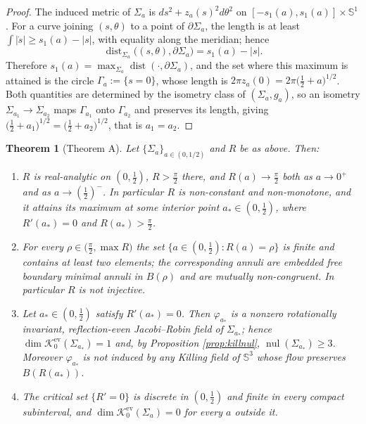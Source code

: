 \documentclass[11pt,a4paper]{amsart}
\theoremstyle{plain}
\newtheorem{theorem}{Theorem}[section]
\theoremstyle{definition}
\newcommand{\Sph}{\mathbb{S}}
\newcommand{\nul}{\operatorname{nul}}
\newcommand{\dist}{\operatorname{dist}}
\newcommand{\Ker}{\mathcal{K}}
\begin{document}
\begin{proof}
The induced metric of $\Sigma_a$ is $ds^2+z_a(s)^2d\theta^2$ on $[-s_1(a),s_1(a)]\times\Sph^1$. For a curve joining $(s,\theta)$ to a point of $\partial\Sigma_a$, the length is at least $\int|\dot s|\geq s_1(a)-|s|$, with equality along the meridian; hence
\[
\dist_{\Sigma_a}\bigl((s,\theta),\partial\Sigma_a\bigr)=s_1(a)-|s| .
\]
Therefore $s_1(a)=\max_{\Sigma_a}\dist(\cdot,\partial\Sigma_a)$, and the set where this maximum is attained is the circle $\Gamma_a:=\{s=0\}$, whose length is $2\pi z_a(0)=2\pi\bigl(\tfrac12+a\bigr)^{1/2}$. Both quantities are determined by the isometry class of $(\Sigma_a,g_a)$, so an isometry $\Sigma_{a_1}\to\Sigma_{a_2}$ maps $\Gamma_{a_1}$ onto $\Gamma_{a_2}$ and preserves its length, giving $\bigl(\tfrac12+a_1\bigr)^{1/2}=\bigl(\tfrac12+a_2\bigr)^{1/2}$, that is $a_1=a_2$.
\end{proof}

\begin{theorem}[Theorem A]\label{thm:main}
Let $\{\Sigma_a\}_{a\in(0,1/2)}$ and $R$ be as above. Then:
\begin{enumerate}
\item[\textup{(i)}] $R$ is real-analytic on $(0,\tfrac12)$, $R>\tfrac\pi2$ there, and $R(a)\to\tfrac\pi2$ both as $a\to 0^+$ and as $a\to(\tfrac12)^-$. In particular $R$ is non-constant and non-monotone, and it attains its maximum at some interior point $a_*\in(0,\tfrac12)$, where $R'(a_*)=0$ and $R(a_*)>\tfrac\pi2$.
\item[\textup{(ii)}] For every $\rho\in\bigl(\tfrac\pi2,\max R\bigr)$ the set $\{a\in(0,\tfrac12):R(a)=\rho\}$ is finite and contains at least two elements; the corresponding annuli are embedded free boundary minimal annuli in $B(\rho)$ and are mutually non-congruent. In particular $R$ is not injective.
\item[\textup{(iii)}] Let $a_*\in(0,\tfrac12)$ satisfy $R'(a_*)=0$. Then $\varphi_{a_*}$ is a nonzero rotationally invariant, reflection-even Jacobi--Robin field of $\Sigma_{a_*}$; hence $\dim\Ker_0^{\mathrm{ev}}(\Sigma_{a_*})=1$ and, by Proposition \ref{prop:killnul}, $\nul(\Sigma_{a_*})\geq 3$. Moreover $\varphi_{a_*}$ is not induced by any Killing field of $\Sph^3$ whose flow preserves $B(R(a_*))$.
\item[\textup{(iv)}] The critical set $\{R'=0\}$ is discrete in $(0,\tfrac12)$ and finite in every compact subinterval, and $\dim\Ker_0^{\mathrm{ev}}(\Sigma_a)=0$ for every $a$ outside it.
\end{enumerate}
\end{theorem}
\end{document}
